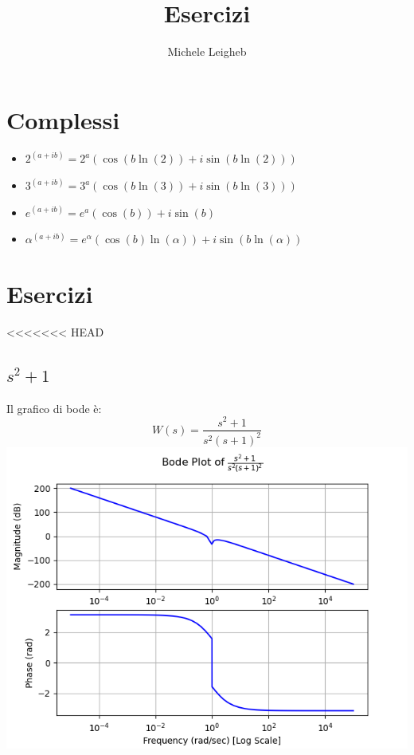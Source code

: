 \documentclass{article}
\title{Esercizi}
\author{Michele Leigheb}
\date{}
\begin{document}
\maketitle
\tableofcontents{}
\section{Complessi}
\begin{itemize}
	\item \(\displaystyle 2^{(a+ib)} = 2^a (\cos(b \ln(2)) + i\sin(b \ln(2))) \)
	\item \(\displaystyle 3^{(a+ib)} = 3^a (\cos(b \ln(3)) + i\sin(b \ln(3))) \)
	\item \(\displaystyle e^{(a+ib)} = e^a (\cos(b)) + i\sin(b) \)
	\item \(\displaystyle \alpha^{(a+ib)} = e^{\alpha} (\cos(b)\ln(\alpha)) + i\sin(b\ln(\alpha)) \)
\end{itemize}



\section{Esercizi}

<<<<<<< HEAD
\subsection{$ s^{2} + 1 $}
Il grafico di bode è:
\[ W(s) = \frac{s^{2} + 1}{s^{2} \left(s + 1\right)^{2}} \]\includegraphics[scale = 0.5]{figures/bode_2948953.png}
\end{document}
